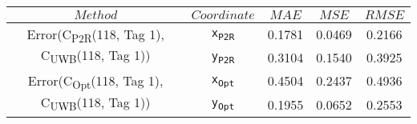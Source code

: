 \begin{table}[h]
\centering
\begin{tabular}{|c|c|c|c|c|}
\hline
$Method$ & $Coordinate$ & $MAE$ & $MSE$ & $RMSE$ \\
\hline
\multirow{2}{*}{{\footnotesize Error(C\textsubscript{P2R}(118, Tag 1), C\textsubscript{UWB}(118, Tag 1))}} & \texttt{x\textsubscript{P2R}} & 0.1781 & 0.0469 & 0.2166 \\
& \texttt{y\textsubscript{P2R}} & 0.3104 & 0.1540 & 0.3925 \\
\hline
\multirow{2}{*}{{\footnotesize Error(C\textsubscript{Opt}(118, Tag 1), C\textsubscript{UWB}(118, Tag 1))}} & \texttt{x\textsubscript{Opt}} & 0.4504 & 0.2437 & 0.4936 \\
& \texttt{y\textsubscript{Opt}} & 0.1955 & 0.0652 & 0.2553 \\
\hline
\end{tabular}
\end{table}
